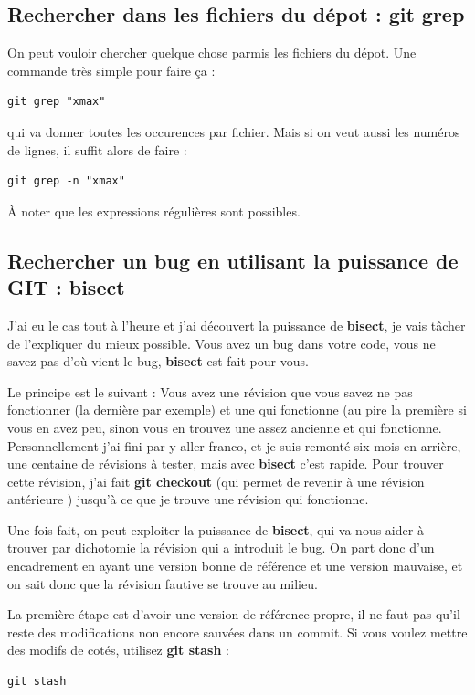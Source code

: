 \documentclass[a4paper,twoside]{article}
\begin{document}
\subsection{Rechercher dans les fichiers du dépot : git grep}
On peut vouloir chercher quelque chose parmis les fichiers du dépot. Une commande très simple pour faire ça : 
\begin{verbatim}
git grep "xmax"
\end{verbatim}
qui va donner toutes les occurences par fichier. Mais si on veut aussi les numéros de lignes, il suffit alors de faire :
\begin{verbatim}
git grep -n "xmax"
\end{verbatim}

\begin{remarque}
À noter que les expressions régulières sont possibles.
\end{remarque}

\subsection{Rechercher un bug en utilisant la puissance de GIT : bisect}
J'ai eu le cas tout à l'heure et j'ai découvert la puissance de \textbf{bisect}, je vais tâcher de l'expliquer du mieux possible. Vous avez un bug dans votre code, vous ne savez pas d'où vient le bug, \textbf{bisect} est fait pour vous. 

Le principe est le suivant : Vous avez une révision que vous savez ne pas fonctionner (la dernière par exemple) et une qui fonctionne (au pire la première si vous en avez peu, sinon vous en trouvez une assez ancienne et qui fonctionne. Personnellement j'ai fini par y aller franco, et je suis remonté six mois en arrière, une centaine de révisions à tester, mais avec \textbf{bisect} c'est rapide. Pour trouver cette révision, j'ai fait \textbf{git checkout} (qui permet de revenir à une révision antérieure ) jusqu'à ce que je trouve une révision qui fonctionne. 

Une fois fait, on peut exploiter la puissance de \textbf{bisect}, qui va nous aider à trouver par dichotomie la révision qui a introduit le bug. On part donc d'un encadrement en ayant une version bonne de référence et une version mauvaise, et on sait donc que la révision fautive se trouve au milieu.

\bigskip

La première étape est d'avoir une version de référence propre, il ne faut pas qu'il reste des modifications non encore sauvées dans un commit. Si vous voulez mettre des modifs de cotés, utilisez \textbf{git stash} : 
\begin{verbatim}
git stash
\end{verbatim}
\end{document}
